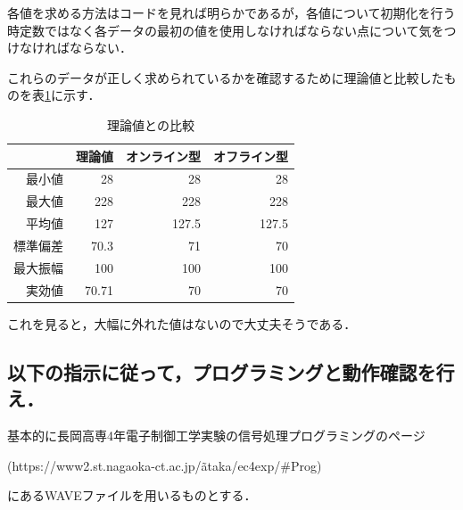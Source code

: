 \documentclass[titlepage]{jarticle}
\begin{document}
各値を求める方法はコードを見れば明らかであるが，各値について初期化を行う時定数ではなく各データの最初の値を使用しなければならない点について気をつけなければならない．

これらのデータが正しく求められているかを確認するために理論値と比較したものを表\ref{hikaku}に示す．
\begin{table}[H]
  \caption{理論値との比較}
  \label{hikaku}
  \centering
  \begin{tabular}{r|rrr}
    \hline
         & 理論値   & オンライン型 & オフライン型 \\\hline\hline
    最小値  & 28    & 28     & 28     \\
    最大値  & 228   & 228    & 228    \\
    平均値  & 127   & 127.5  & 127.5  \\
    標準偏差 & 70.3  & 71     & 70     \\
    最大振幅 & 100   & 100    & 100    \\
    実効値  & 70.71 & 70     & 70     \\\hline
  \end{tabular}
\end{table}

これを見ると，大幅に外れた値はないので大丈夫そうである．
\subsection{以下の指示に従って，プログラミングと動作確認を行え．}
基本的に長岡高専4年電子制御工学実験の信号処理プログラミングのページ

(https://www2.st.nagaoka-ct.ac.jp/\~ataka/ec4exp/\#Prog)

にあるWAVEファイルを用いるものとする．
\end{document}
